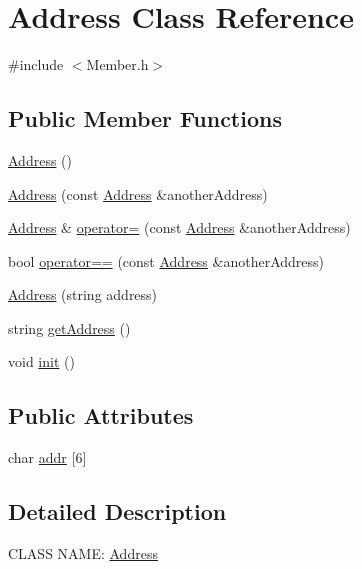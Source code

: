 \hypertarget{class_address}{\section{\-Address \-Class \-Reference}
\label{df/d9a/class_address}
}


{\ttfamily \#include $<$\-Member.\-h$>$}

\subsection*{\-Public \-Member \-Functions}
\begin{DoxyCompactItemize}
\item 
\hyperlink{class_address_a63f910c09d93bdd16d3744e47d13dc0e}{\-Address} ()
\item 
\hyperlink{class_address_ab14aae7ff0f39b244c4d75e0b96d132d}{\-Address} (const \hyperlink{class_address}{\-Address} \&another\-Address)
\item 
\hyperlink{class_address}{\-Address} \& \hyperlink{class_address_a4c0a8dc60c82758c99eec9a509183e66}{operator=} (const \hyperlink{class_address}{\-Address} \&another\-Address)
\item 
bool \hyperlink{class_address_ab0cbc2009a68a7062e70cb258363e5d7}{operator==} (const \hyperlink{class_address}{\-Address} \&another\-Address)
\item 
\hyperlink{class_address_a6915aea64cda2c642130616d1348969d}{\-Address} (string address)
\item 
string \hyperlink{class_address_a81c2bb60d0be5733eef6fa521775e06b}{get\-Address} ()
\item 
void \hyperlink{class_address_af95a4eb279d001262fa268e7f46bdd83}{init} ()
\end{DoxyCompactItemize}
\subsection*{\-Public \-Attributes}
\begin{DoxyCompactItemize}
\item 
char \hyperlink{class_address_a19157536e8e684b3db6b73aa312a057c}{addr} \mbox{[}6\mbox{]}
\end{DoxyCompactItemize}


\subsection{\-Detailed \-Description}
\-C\-L\-A\-S\-S \-N\-A\-M\-E\-: \hyperlink{class_address}{\-Address}

